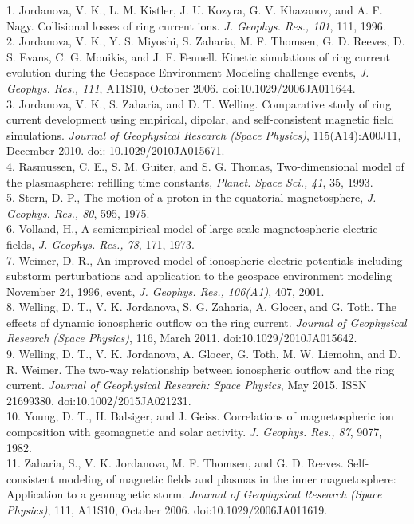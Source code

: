 
1. Jordanova, V. K., L. M. Kistler, J. U. Kozyra, G. V. Khazanov, and A. F. Nagy. Collisional losses of ring current ions. {\it J. Geophys. Res., 101}, 111, 1996.
\\
2. Jordanova, V. K., Y. S. Miyoshi, S. Zaharia, M. F. Thomsen, G. D. Reeves, D. S. Evans, C. G. Mouikis, and J. F. Fennell. Kinetic simulations of ring current evolution during the Geospace Environment Modeling challenge events, {\it J. Geophys. Res., 111}, A11S10, October 2006. doi:10.1029/2006JA011644.
\\
3. Jordanova, V. K., S. Zaharia, and D. T. Welling. Comparative study of ring current development using empirical, dipolar, and self-consistent magnetic field simulations. {\it Journal of Geophysical Research (Space
Physics)}, 115(A14):A00J11, December 2010. doi: 10.1029/2010JA015671. 
\\
4. Rasmussen, C. E., S. M. Guiter, and S. G. Thomas, Two-dimensional model of the plasmasphere: refilling time constants, {\it Planet. Space Sci., 41}, 35, 1993. 
\\
5. Stern, D. P., The motion of a proton in the equatorial magnetosphere, {\it J. Geophys. Res., 80}, 595, 1975.
\\
6. Volland, H., A semiempirical model of large-scale magnetospheric electric fields, {\it J. Geophys. Res., 78}, 171, 1973.
\\
7. Weimer, D. R., An improved model of ionospheric electric potentials including substorm perturbations and application to the geospace environment modeling November 24, 1996, event, {\it J. Geophys. Res., 106(A1)}, 407, 2001.
\\
8. Welling, D. T., V. K. Jordanova, S. G. Zaharia, A. Glocer, and G. Toth. The effects of dynamic ionospheric outflow on the ring current. {\it Journal of Geophysical Research (Space Physics)}, 116, March 2011. doi:10.1029/2010JA015642.
\\
9. Welling, D. T., V. K. Jordanova, A. Glocer, G. Toth, M. W. Liemohn, and D. R. Weimer. The two-way relationship between ionospheric outflow and the ring current. {\it Journal of Geophysical Research:
Space Physics}, May 2015. ISSN 21699380. doi:10.1002/2015JA021231. 
\\
10. Young, D. T., H. Balsiger, and J. Geiss. Correlations of magnetospheric ion composition with geomagnetic and solar activity. {\it J. Geophys. Res., 87}, 9077, 1982.
\\
11. Zaharia, S., V. K. Jordanova, M. F. Thomsen, and G. D. Reeves. Self-consistent modeling of magnetic fields and plasmas in the inner magnetosphere: Application to a geomagnetic storm. {\it Journal of Geophysical Research (Space Physics)}, 111, A11S10, October 2006. doi:10.1029/2006JA011619.

